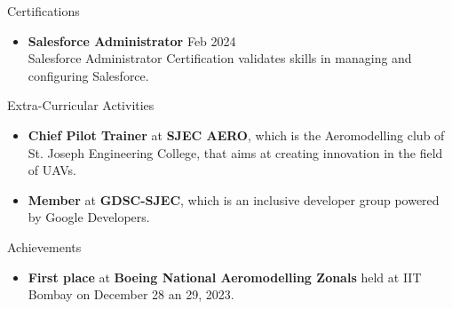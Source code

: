 \documentclass{resume} %
\begin{document}
\begin{rSection}{Certifications} 
    \begin{itemize}
        \item \textbf{Salesforce Administrator} \hfill Feb 2024\\
        Salesforce Administrator Certification validates skills in managing and configuring Salesforce.
    \end{itemize}
    
    
    \end{rSection}
    \begin{rSection}{Extra-Curricular Activities} 
\begin{itemize}
    \item 	\textbf{Chief Pilot Trainer} at \textbf{SJEC AERO}, which is the Aeromodelling club of St. Joseph Engineering College, that aims at creating innovation in the field of UAVs.
    \item	\textbf{Member} at \textbf{GDSC-SJEC}, which is an inclusive developer group powered by Google Developers.

\end{itemize}


\end{rSection}

\begin{rSection}{Achievements} 
    \begin{itemize}
        \item 	\textbf{First place} at \textbf{Boeing National Aeromodelling Zonals} held at IIT Bombay on December 28 an 29, 2023.
    
    \end{itemize}
    
    
    \end{rSection}
\end{document}
